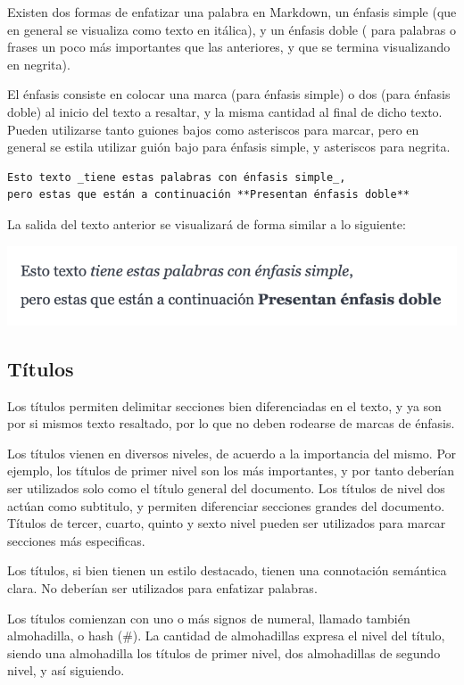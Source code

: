 Existen dos formas de enfatizar una palabra en Markdown, un énfasis simple
(que en general se visualiza como texto en itálica), y un énfasis doble (
para palabras o frases un poco más importantes que las anteriores, y que se
termina visualizando en negrita).

El énfasis consiste en colocar una marca (para énfasis simple) o dos (para énfasis
doble) al inicio del texto a resaltar, y la misma cantidad al final de dicho texto.
Pueden utilizarse tanto guiones bajos como asteriscos para marcar, pero en general
se estila utilizar guión bajo para énfasis simple, y asteriscos para negrita.

\begin{lstlisting}[language=Markdown]
Esto texto _tiene estas palabras con énfasis simple_,
pero estas que están a continuación **Presentan énfasis doble**
\end{lstlisting}

La salida del texto anterior se visualizará de forma similar
a lo siguiente:

\includegraphics[]{anexos/1_lenguajes_marcado/1_markdown/imagenes/md_enfasis.png}

\subsection*{Títulos}

Los títulos permiten delimitar secciones bien diferenciadas en el texto,
y ya son por si mismos texto resaltado, por lo que no deben rodearse de
marcas de énfasis.

Los títulos vienen en diversos niveles, de acuerdo a la importancia del
mismo. Por ejemplo, los títulos de primer nivel son los más importantes,
y por tanto deberían ser utilizados solo como el título general del documento.
Los títulos de nivel dos actúan como subtitulo, y permiten diferenciar
secciones grandes del documento. Títulos de tercer, cuarto, quinto y sexto
nivel pueden ser utilizados para marcar secciones más especificas.

Los títulos, si bien tienen un estilo destacado, tienen una connotación
semántica clara. No deberían ser utilizados para enfatizar palabras.

Los títulos comienzan con uno o más signos de numeral, llamado también
almohadilla, o hash (\#). La cantidad de almohadillas expresa el nivel
del título, siendo una almohadilla los títulos de primer nivel, dos almohadillas
de segundo nivel, y así siguiendo.


